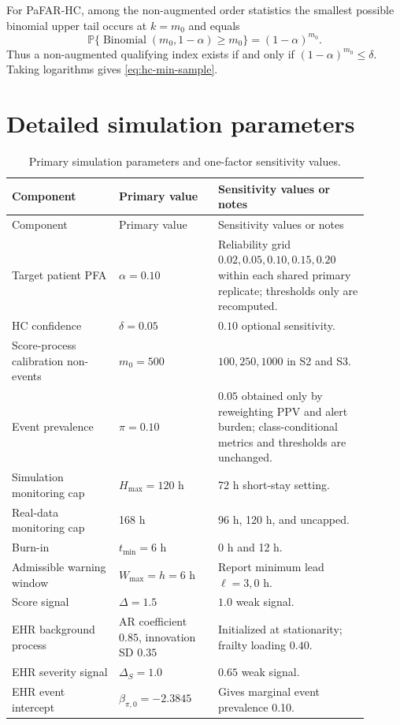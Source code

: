 \documentclass[11pt]{article}
\newcommand{\Pp}{\mathbb{P}}
\begin{document}
For PaFAR-HC, among the non-augmented order statistics the smallest possible binomial upper tail occurs at $k=m_0$ and equals
\[
\Pp\{\operatorname{Binomial}(m_0,1-\alpha)\ge m_0\}
=(1-\alpha)^{m_0}.
\]
Thus a non-augmented qualifying index exists if and only if $(1-\alpha)^{m_0}\le\delta$. Taking logarithms gives \eqref{eq:hc-min-sample}.

\section{Detailed simulation parameters}\label{app:simulation-parameters}

\begin{longtable}{L{0.27\linewidth}L{0.25\linewidth}L{0.38\linewidth}}
\caption{Primary simulation parameters and one-factor sensitivity values.}\label{tab:sim-parameters}\\
\toprule
Component & Primary value & Sensitivity values or notes \\
\midrule
\endfirsthead
\toprule
Component & Primary value & Sensitivity values or notes \\
\midrule
\endhead
Target patient PFA & $\alpha=0.10$ & Reliability grid $0.02,0.05,0.10,0.15,0.20$ within each shared primary replicate; thresholds only are recomputed. \\
HC confidence & $\delta=0.05$ & $0.10$ optional sensitivity. \\
Score-process calibration non-events & $m_0=500$ & $100,250,1000$ in S2 and S3. \\
Event prevalence & $\pi=0.10$ & $0.05$ obtained only by reweighting PPV and alert burden; class-conditional metrics and thresholds are unchanged. \\
Simulation monitoring cap & $H_{\max}=120$ h & 72 h short-stay setting. \\
Real-data monitoring cap & 168 h & 96 h, 120 h, and uncapped. \\
Burn-in & $t_{\min}=6$ h & 0 h and 12 h. \\
Admissible warning window & $W_{\max}=h=6$ h & Report minimum lead $\ell=3,0$ h. \\
Score signal & $\Delta=1.5$ & $1.0$ weak signal. \\
EHR background process & AR coefficient $0.85$, innovation SD $0.35$ & Initialized at stationarity; frailty loading $0.40$. \\
EHR severity signal & $\Delta_S=1.0$ & $0.65$ weak signal. \\
EHR event intercept & $\beta_{\pi,0}=-2.3845$ & Gives marginal event prevalence 0.10. \\

\end{longtable}
\end{document}
